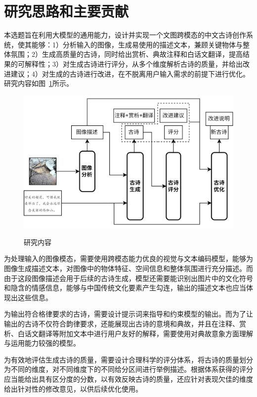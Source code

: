 \section{研究思路和主要贡献}

本选题旨在利用大模型的通用能力，设计并实现一个文图跨模态的中文古诗创作系统，使其能够：1）分析输入的图像，生成易使用的描述文本，兼顾关键物体与整体氛围；2）生成高质量的古诗，同时给出赏析、典故注释和白话文翻译，提高结果的可解释性；3）对生成古诗进行评分，从多个维度解析古诗的质量，并给出改进建议；4）对生成的古诗进行改进，在不脱离用户输入需求的前提下进行优化。研究内容如图~\ref{fig:研究内容}所示。


\begin{figure}[ht]
  \centering
  \includegraphics[width=1\textwidth]
  {figures/研究内容.jpg}\\
  \caption{研究内容}
  \label{fig:研究内容} %
\end{figure}

为处理输入的图像模态，需要使用跨模态能力优良的视觉与文本编码模型，能够为图像生成描述文本，对图像中的物体特征、空间信息和整体氛围进行充分描述。而由于这段图像描述会用于后续的古诗生成，模型还需要能识别出图片中的文化符号和隐含的情感信息，能够与中国传统文化要素产生勾连，输出的描述文本也应当体现出这些信息。

为输出符合格律要求的古诗，需要设计提示词来指导和约束模型的输出。而为了让输出的古诗不仅符合韵律要求，还能展现出古诗的意境和典故，并且在注释、赏析、白话文翻译等附加文本中进行用户友好的解释，需要使用对典故意象方面理解与运用能力较强的模型。

为有效地评估生成古诗的质量，需要设计合理科学的评分体系，将古诗的质量划分为不同的维度，对不同维度下的不同给分区间进行举例描述。根据体系获得的评分应当能给出具有区分度的分数，以有效反映古诗的质量，还应针对表现欠佳的维度给出针对性的修改意见，以供后续优化使用。

